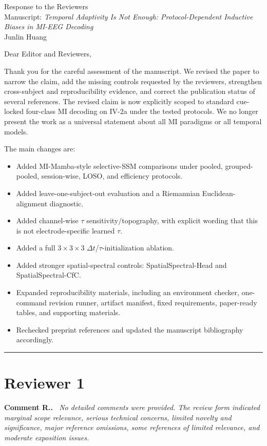 \documentclass[11pt]{article}
\newcounter{reviewer}
\newcounter{point}[reviewer]
\renewcommand{\thepoint}{\thereviewer.\arabic{point}}
\newcommand{\reviewersection}[1]{%
  \stepcounter{reviewer}%
  \setcounter{point}{0}%
  \bigskip\hrule\medskip%
  \section*{Reviewer #1}%
}
\newenvironment{reviewercomment}
  {\refstepcounter{point}\medskip\noindent\textbf{Comment R\thepoint.}\itshape\ }
  {\par}
\begin{document}
\begin{center}
{\Large Response to the Reviewers}\\[0.5em]
{\large Manuscript: \emph{Temporal Adaptivity Is Not Enough: Protocol-Dependent Inductive Biases in MI-EEG Decoding}}\\[0.25em]
Junlin Huang
\end{center}

\noindent Dear Editor and Reviewers,

\medskip
\noindent Thank you for the careful assessment of the manuscript. We revised the paper to narrow the claim, add the missing controls requested by the reviewers, strengthen cross-subject and reproducibility evidence, and correct the publication status of several references. The revised claim is now explicitly scoped to standard cue-locked four-class MI decoding on IV-2a under the tested protocols. We no longer present the work as a universal statement about all MI paradigms or all temporal models.

\medskip
\noindent The main changes are:
\begin{itemize}[leftmargin=1.5em]
  \item Added MI-Mamba-style selective-SSM comparisons under pooled, grouped-pooled, session-wise, LOSO, and efficiency protocols.
  \item Added leave-one-subject-out evaluation and a Riemannian Euclidean-alignment diagnostic.
  \item Added channel-wise $\tau$ sensitivity/topography, with explicit wording that this is not electrode-specific learned $\tau$.
  \item Added a full $3\times3\times3$ $\Delta t$/$\tau$-initialization ablation.
  \item Added stronger spatial-spectral controls: SpatialSpectral-Head and SpatialSpectral-CfC.
  \item Expanded reproducibility materials, including an environment checker, one-command revision runner, artifact manifest, fixed requirements, paper-ready tables, and supporting materials.
  \item Rechecked preprint references and updated the manuscript bibliography accordingly.
\end{itemize}

\reviewersection{1}

\begin{reviewercomment}
No detailed comments were provided. The review form indicated marginal scope relevance, serious technical concerns, limited novelty and significance, major reference omissions, some references of limited relevance, and moderate exposition issues.
\end{reviewercomment}
\end{document}
